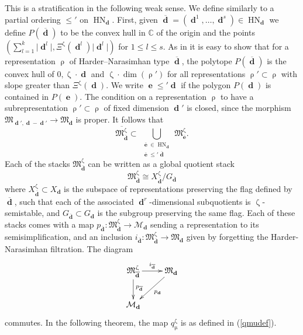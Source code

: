 \documentclass[a4paper,10pt]{amsart}
\renewcommand{\zeta}{\upzeta}
\renewcommand{\rho}{\uprho}
\renewcommand{\mu}{\upmu}
\DeclareMathOperator{\HN}{HN}
\newcommand{\Mu}{\Xi}
\newcommand{\Mst}{\mathfrak{M}}
\newcommand{\Msp}{\mathcal{M}}
\DeclareMathOperator{\dd}{\mathbf{d}}
\DeclareMathOperator{\ee}{\mathbf{e}}
\begin{document}
This is a stratification in the following weak sense.  We define similarly to \cite[Def.3.6]{Reineke_HN} a partial ordering $\leq'$ on $\HN_{\dd}$.  First, given $\overline{\dd}=(\dd^1,\ldots,\dd^s)\in\HN_{\dd}$ we define $P(\overline{\dd})$ to be the convex hull in $\mathbb{C}$ of the origin and the points $(\sum_{l=1}^k\lvert \dd^l\rvert,\Mu^{\zeta}(\dd^l)\lvert\dd^l\rvert)$ for $1\leq l\leq s$.  As in \cite[Prop.3.7]{Reineke_HN} it is easy to show that for a representation $\rho$ of Harder--Narasimhan type $\overline{\dd}$, the polytope $P(\overline{\dd})$ is the convex hull of $0,\zeta\cdot\dd$ and $\zeta\cdot\dim(\rho')$ for all representations $\rho'\subset \rho$ with slope greater than $\Mu^{\zeta}(\dd)$. We write $\ee\leq'\dd$ if the polygon $P(\dd)$ is contained in $P(\ee)$.  The condition on a representation $\rho$ to have a subrepresentation $\rho'\subset\rho$ of fixed dimension $\dd'$ is closed, since the morphism $\Mst_{\dd',\dd-\dd'}\rightarrow \Mst_{\dd}$ is proper.  It follows that
\[
\overline{\Mst_{\overline{\dd}}^{\zeta}}\subset \bigcup_{\substack{\overline{\ee}\in\HN_{\dd}\\ \overline{\ee}\leq' \overline{\dd}}}\Mst_{\overline{\ee}}^{\zeta}.
\]
Each of the stacks $\Mst^{\zeta}_{\overline{\dd}}$ can be written as a global quotient stack
\[
\Mst^{\zeta}_{\overline{\dd}}\cong X^{\zeta}_{\overline{\dd}}/G_{\overline{\dd}}
\]
where $X^{\zeta}_{\overline{\dd}}\subset X_{\dd}$ is the subspace of representations preserving the flag defined by $\overline{\dd}$, such that each of the associated $\dd^r$-dimensional subquotients is $\zeta$-semistable, and $G_{\overline{\dd}}\subset G_{\dd}$ is the subgroup preserving the same flag.  Each of these stacks comes with a map $p_{\overline{\dd}}\colon \Mst^{\zeta}_{\overline{\dd}}\rightarrow\Msp_{\dd}$ sending a representation to its semisimplification, and an inclusion $i_{\overline{\dd}}\colon \Mst^{\zeta}_{\overline{\dd}}\rightarrow \Mst_{\dd}$ given by forgetting the Harder-Narasimhan filtration.  The diagram
\[
\xymatrix{
\Mst_{\overline{\dd}}^{\zeta}\ar[d]^{p_{\overline{\dd}}}\ar[r]^{i_{\overline{\dd}}}&\Mst_{\dd}\ar[dl]^{p_{\dd}}\\
\Msp_{\dd}
}
\]
commutes.  In the following theorem, the map $q^{\zeta}_{\mu}$ is as defined in (\ref{qmudef}).
\end{document}
